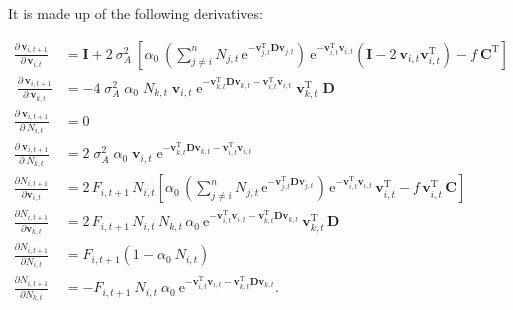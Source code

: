 It is made up of the following derivatives:

\begin{equation*}
\begin{split}
    \frac{ \partial \, \mathbf{v}_{i,t+1} }{ \partial \, \mathbf{v}_{i,t} } &= 
    \mathbf{I} + 2 ~ \sigma_A^2 ~
        \left[
            \alpha_0 ~ \left(
                \sum_{j \ne i}^{n}{ N_{j,t} \, \textrm{e}^{
                - \mathbf{v}_{j,t}^{\textrm{T}}
                \mathbf{D} \mathbf{v}_{j,t} } }
            \right) ~ \textrm{e}^{ - \mathbf{v}_{i,t}^{\textrm{T}} \mathbf{v}_{i,t} }
            \left(
                \mathbf{I} - 2 ~ \mathbf{v}_{i,t} \mathbf{v}_{i,t}^{\textrm{T}}
            \right) -
            f \: \mathbf{C}^{\textrm{T}}
        \right] \\\
% 
    \frac{ \partial \: \mathbf{v}_{i,t+1} }{ \partial \: \mathbf{v}_{k,t}} &=
        -4 \; \sigma_A^2 \; \alpha_0 \; N_{k,t} \; \mathbf{v}_{i,t} \;
        \textrm{e}^{
                    - \mathbf{v}_{k,t}^{\textrm{T}} \mathbf{D} \mathbf{v}_{k,t}
                    - \mathbf{v}_{i,t}^{\textrm{T}} \mathbf{v}_{i,t}
                } \;
        \mathbf{v}_{k,t}^{\textrm{T}} \; \mathbf{D} \\
% 
    \frac{ \partial \: \mathbf{v}_{i,t+1} }{ \partial \: N_{i,t} } &= 0 \\
    \frac{ \partial \: \mathbf{v}_{i,t+1} }{ \partial \: N_{k,t} } &=
        2 \; \sigma_A^2 \; \alpha_0 \; \mathbf{v}_{i,t} \;
        \textrm{e}^{ - \mathbf{v}_{k,t}^{\textrm{T}} \mathbf{D} \mathbf{v}_{k,t}
            - \mathbf{v}_{i,t}^{\textrm{T}} \mathbf{v}_{i,t} } \\
% 
    \frac{ \partial N_{i,t+1} }{ \partial \mathbf{v}_{i,t} } &= 
        2 \, F_{i,t+1} \,  N_{i,t}
        \left[
            \alpha_0 \, \left(
                \sum_{j \ne i}^{n}{ N_{j,t} \, \textrm{e}^{
                - \mathbf{v}_{j,t}^{\textrm{T}}
                \mathbf{D} \mathbf{v}_{j,t} } }
            \right) \, \text{e}^{ -\mathbf{v}_{i,t}^{\text{T}}
            \mathbf{v}_{i,t} } \, \mathbf{v}_{i,t}^{\text{T}}
            - f \, \mathbf{v}_{i,t}^{\text{T}} \, \mathbf{C}
        \right] \\
    \frac{ \partial N_{i,t+1} }{ \partial \mathbf{v}_{k,t} } &= 
        2 \, F_{i,t+1} \, N_{i,t} \, N_{k,t} \, \alpha_0 \: 
        \text{e}^{ -\mathbf{v}_{i,t}^{\text{T}} \mathbf{v}_{i,t} -
            \mathbf{v}_{k,t}^{\text{T}} \mathbf{D} \mathbf{v}_{k,t} } \:
        \mathbf{v}_{k,t}^{\text{T}} \, \mathbf{D} \\
% 
    \frac{ \partial N_{i,t+1} }{ \partial N_{i,t} } &= 
        F_{i,t+1} \left( 1 - \alpha_0 \: N_{i,t} \right) \\
    \frac{ \partial N_{i,t+1} }{ \partial N_{k,t} } &= 
        - F_{i,t+1} \: N_{i,t} \: \alpha_0 \: 
        \text{e}^{ -\mathbf{v}_{i,t}^{\text{T}} \mathbf{v}_{i,t} -
            \mathbf{v}_{k,t}^{\text{T}} \mathbf{D} \mathbf{v}_{k,t} } 
    \textrm{.}
\end{split}
\end{equation*}


